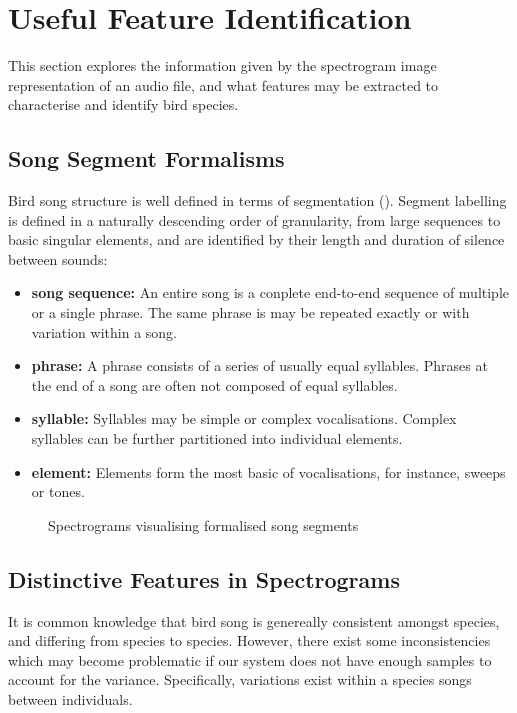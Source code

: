 \section{Useful Feature Identification}
This section explores the information given by the spectrogram image
representation of an audio file, and what features may be extracted to
characterise and identify bird species.

\subsection{Song Segment Formalisms}
Bird song structure is well defined in terms of segmentation (\textcite{Catch1997}).
Segment labelling is defined in a naturally descending order of granularity, from
large sequences to basic singular elements, and are identified by their length
and duration of silence between sounds:
\begin{itemize}
  \item \textbf{song sequence:}
    An entire song is a conplete end-to-end sequence of multiple or a single
    phrase.
    The same phrase is may be repeated exactly or with variation within a
    song.
  \item \textbf{phrase:}
    A phrase consists of a series of usually equal syllables.
    Phrases at the end of a song are often not composed of equal syllables.
  \item \textbf{syllable:}
    Syllables may be simple or complex vocalisations.
    Complex syllables can be further partitioned into individual elements.
  \item \textbf{element:}
    Elements form the most basic of vocalisations, for instance, sweeps or tones.
\end{itemize}

\begin{figure}[!htb]
  \centering
  \begin{subfigure}[t]{0.5\textwidth}
    \centering
    \caption{}
  \end{subfigure}
  \begin{subfigure}[t]{0.5\textwidth}
    \centering
    \caption{}
  \end{subfigure}
  \caption{Spectrograms visualising formalised song segments}
\end{figure}

\subsection{Distinctive Features in Spectrograms}
It is common knowledge that bird song is genereally consistent amongst species,
and differing from species to species.
However, there exist some inconsistencies which may become problematic if our
system does not have enough samples to account for the variance.
Specifically, variations exist within a species songs between individuals.

